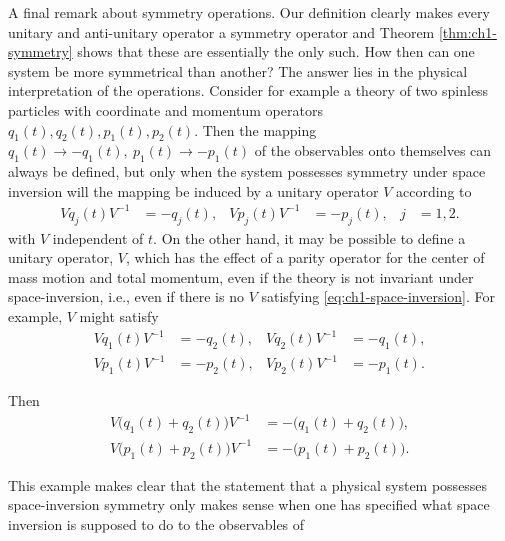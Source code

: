 A final remark about symmetry operations. Our definition clearly makes every
unitary and anti-unitary operator a symmetry operator and Theorem \ref{thm:ch1-symmetry} shows
that these are essentially the only such. How then can one system be more
symmetrical than another? The answer lies in the physical interpretation of
the operations. Consider for example a theory of two spinless particles with
coordinate and momentum operators \(q_1(t),q_2(t),p_1(t),p_2(t)\). Then the
mapping \(q_1(t)\to-q_1(t),\ p_1(t)\to-p_1(t)\) of the observables onto
themselves can always be defined, but only when the system possesses symmetry
under space inversion will the mapping be induced by a unitary operator \(V\)
according to
\begin{equation}
\begin{aligned}
  Vq_j(t)V^{-1}&=-q_j(t), & Vp_j(t)V^{-1}&=-p_j(t), & j&=1,2.
\end{aligned}
  \tag{1-3}\label{eq:ch1-space-inversion}
\end{equation}
with \(V\) independent of \(t\). On the other hand, it may be possible to
define a unitary operator, \(V\), which has the effect of a parity operator for
the center of mass motion and total momentum, even if the theory is not
invariant under space-inversion, i.e., even if there is no \(V\) satisfying
\eqref{eq:ch1-space-inversion}. For example, \(V\) might satisfy
\begin{equation*}
\begin{aligned}
  Vq_1(t)V^{-1}&=-q_2(t), & Vq_2(t)V^{-1}&=-q_1(t),\\
  Vp_1(t)V^{-1}&=-p_2(t), & Vp_2(t)V^{-1}&=-p_1(t).
\end{aligned}
\end{equation*}

Then
\begin{equation*}
\begin{aligned}
  V\bigl(q_1(t)+q_2(t)\bigr)V^{-1}
    &=-\bigl(q_1(t)+q_2(t)\bigr),\\
  V\bigl(p_1(t)+p_2(t)\bigr)V^{-1}
    &=-\bigl(p_1(t)+p_2(t)\bigr).
\end{aligned}
\end{equation*}

This example makes clear that the statement that a physical system possesses
space-inversion symmetry only makes sense when one has specified what space
inversion is supposed to do to the observables of

